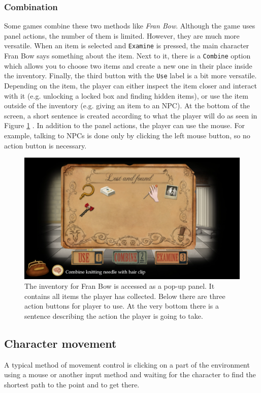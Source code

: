 \subsubsection{Combination}
Some games combine these two methods like \textit{Fran Bow}. Although the game uses panel actions, the number of them is limited. However, they are much more versatile. When an item is selected and \texttt{Examine} is pressed, the main character Fran Bow says something about the item. Next to it, there is a \texttt{Combine} option which allows you to choose two items and create a new one in their place inside the inventory. Finally, the third button with the \texttt{Use} label is a bit more versatile. Depending on the item, the player can either inspect the item closer and interact with it (e.g. unlocking a locked box and finding hidden items), or use the item outside of the inventory (e.g. giving an item to an NPC). At the bottom of the screen, a short sentence is created according to what the player will do as seen in Figure \ref{fig:A-FranBow} . 
In addition to the panel actions, the player can use the mouse. For example, talking to NPCs is done only by clicking the left mouse button, so no action button is necessary. 
\begin{figure}[H]
\centering
\includegraphics[width=1.\linewidth]{img/Fran_Bow.png}
\caption{The inventory for Fran Bow is accessed as a pop-up panel. It contains all items the player has collected. Below there are three action buttons for player to use. At the very bottom there is a sentence describing the action the player is going to take.}
\label{fig:A-FranBow}
\end{figure}

\subsection{Character movement}
A typical method of movement control is clicking on a part of the environment using a mouse or another input method and waiting for the character to find the shortest path to the point and to get there. 

